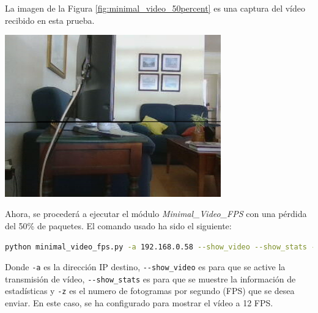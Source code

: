 \newpage
La imagen de la Figura \ref{fig:minimal_video_50percent} es una captura del vídeo recibido en esta prueba.
\begin{center}
  \includegraphics[width = 0.7\textwidth]{images/VideoRecibido9.1.png}
  \label{fig:minimal_video_50percent}
\end{center}

\newpage


Ahora, se procederá a ejecutar el módulo \textit{Minimal\_Video\_FPS} con una pérdida del 50\% de paquetes. El comando usado ha sido el siguiente:

\begin{lstlisting}[language=bash, basicstyle=\ttfamily\scriptsize]
    python minimal_video_fps.py -a 192.168.0.58 --show_video --show_stats -z 12
\end{lstlisting}
Donde \verb|-a| es la dirección IP destino, \verb|--show_video| es para que se active la transmisión de vídeo, \verb|--show_stats| es para que se muestre la información de estadísticas y \verb|-z| es el numero de fotogramas por segundo (FPS) que se desea enviar. En este caso, se ha configurado para mostrar el vídeo a 12 FPS.
\vspace{\baselineskip}

